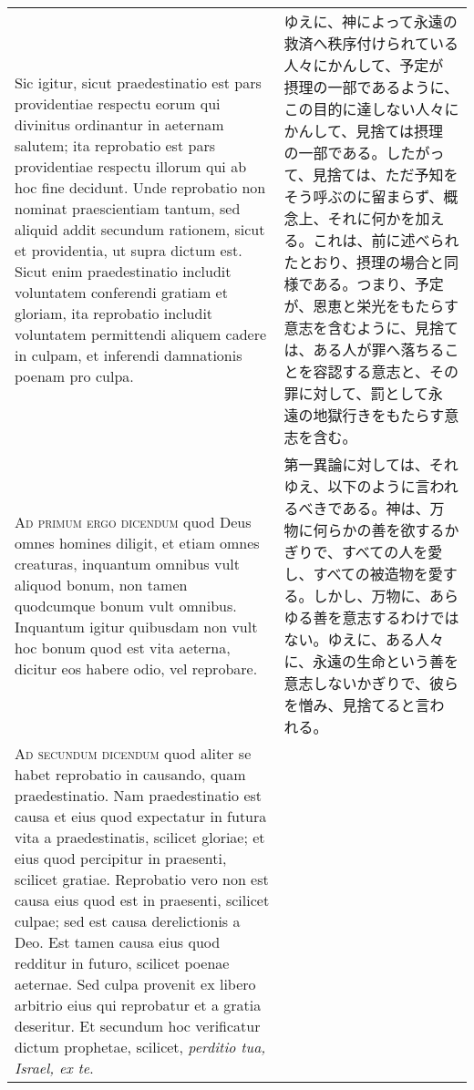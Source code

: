 \documentclass[10pt]{jsarticle} %
\begin{document}
\begin{longtable}{p{21em}p{21em}}
 \\


 Sic igitur, sicut praedestinatio est
pars providentiae respectu eorum qui divinitus ordinantur in aeternam
salutem; ita reprobatio est pars providentiae respectu illorum qui ab
hoc fine decidunt. Unde reprobatio non nominat praescientiam tantum, sed
aliquid addit secundum rationem, sicut et providentia, ut supra dictum
est. Sicut enim praedestinatio includit voluntatem conferendi gratiam et
gloriam, ita reprobatio includit voluntatem permittendi aliquem cadere
in culpam, et inferendi damnationis poenam pro culpa.


&

ゆえに、神によって永遠の救済へ秩序付けられている人々にかんして、予定が
摂理の一部であるように、この目的に達しない人々にかんして、見捨ては摂理
の一部である。したがって、見捨ては、ただ予知をそう呼ぶのに留まらず、概
念上、それに何かを加える。これは、前に述べられたとおり、摂理の場合と同
様である。つまり、予定が、恩恵と栄光をもたらす意志を含むように、見捨て
は、ある人が罪へ落ちることを容認する意志と、その罪に対して、罰として永
遠の地獄行きをもたらす意志を含む。
 

\\


{\scshape Ad primum ergo dicendum} quod Deus omnes
homines diligit, et etiam omnes creaturas, inquantum omnibus vult
aliquod bonum, non tamen quodcumque bonum vult omnibus. Inquantum igitur
quibusdam non vult hoc bonum quod est vita aeterna, dicitur eos habere
odio, vel reprobare.


&

第一異論に対しては、それゆえ、以下のように言われるべきである。神は、万
物に何らかの善を欲するかぎりで、すべての人を愛し、すべての被造物を愛す
る。しかし、万物に、あらゆる善を意志するわけではない。ゆえに、ある人々
に、永遠の生命という善を意志しないかぎりで、彼らを憎み、見捨てると言わ
れる。

 
\\


{\scshape Ad secundum dicendum} quod aliter se habet
reprobatio in causando, quam praedestinatio. Nam praedestinatio est
causa et eius quod expectatur in futura vita a praedestinatis, scilicet
gloriae; et eius quod percipitur in praesenti, scilicet
gratiae. Reprobatio vero non est causa eius quod est in praesenti,
scilicet culpae; sed est causa derelictionis a Deo. Est tamen causa eius
quod redditur in futuro, scilicet poenae aeternae. Sed culpa provenit ex
libero arbitrio eius qui reprobatur et a gratia deseritur. Et secundum
hoc verificatur dictum prophetae, scilicet, {\itshape perditio tua, Israel, ex te}.



\end{longtable}
\end{document}
